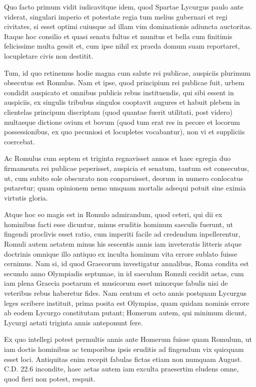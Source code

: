  Quo facto primum vidit iudicavitque idem, quod Spartae Lycurgus paulo ante viderat, singulari imperio et potestate regia tum melius gubernari et regi civitates, si esset optimi cuiusque ad illam vim dominationis adiuncta auctoritas. Itaque hoc consilio et quasi senatu fultus et munitus et bella cum finitimis felicissime multa gessit et, cum ipse nihil ex praeda domum suam reportaret, locupletare civis non destitit.

 Tum, id quo retinemus hodie magna cum salute rei publicae, auspiciis plurimum obsecutus est Romulus. Nam et ipse, quod principium rei publicae fuit, urbem condidit auspicato et omnibus publicis rebus instituendis, qui sibi essent in auspiciis, ex singulis tribubus singulos cooptavit augures et habuit plebem in clientelas principum discriptam (quod quantae fuerit utilitati, post videro) multaeque dictione ovium et bovum (quod tum erat res in pecore et locorum possessionibus, ex quo pecuniosi et locupletes vocabantur), non vi et suppliciis coercebat.

 Ac Romulus cum septem et triginta regnavisset annos et haec egregia duo firmamenta rei publicae peperisset, auspicia et senatum, tantum est consecutus, ut, cum subito sole obscurato non conparuisset, deorum in numero conlocatus putaretur; quam opinionem nemo umquam mortalis adsequi potuit sine eximia virtutis gloria.

 Atque hoc eo magis est in Romulo admirandum, quod ceteri, qui dii ex hominibus facti esse dicuntur, minus eruditis hominum saeculis fuerunt, ut fingendi proclivis esset ratio, cum imperiti facile ad credendum inpellerentur, Romuli autem aetatem minus his sescentis annis iam inveteratis litteris atque doctrinis omnique illo antiquo ex inculta hominum vita errore sublato fuisse cernimus. Nam si, id quod Graecorum investigatur annalibus, Roma condita est secundo anno Olympiadis septumae, in id saeculum Romuli cecidit aetas, cum iam plena Graecia poetarum et musicorum esset minorque fabulis nisi de veteribus rebus haberetur fides. Nam centum et octo annis postquam Lycurgus leges scribere instituit, prima posita est Olympias, quam quidam nominis errore ab eodem Lycurgo constitutam putant; Homerum autem, qui minimum dicunt, Lycurgi aetati triginta annis anteponunt fere.

 Ex quo intellegi potest permultis annis ante Homerum fuisse quam Romulum, ut iam doctis hominibus ac temporibus ipsis eruditis ad fingendum vix quicquam esset loci. Antiquitas enim recepit fabulas fictas etiam non numquam August. C.D. 22.6 incondite, haec aetas autem iam exculta praesertim eludens omne, quod fieri non potest, respuit.

